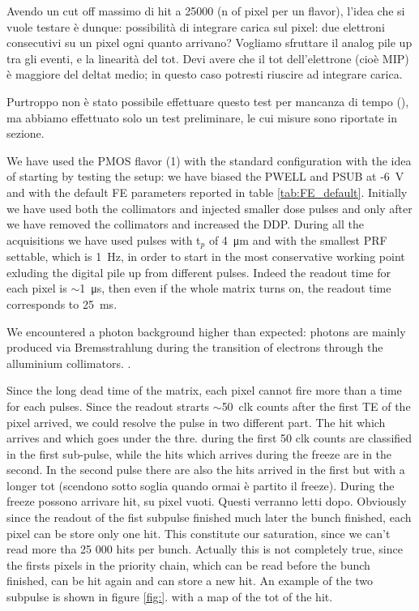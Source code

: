    Avendo un cut off massimo di hit a 25000 (n of pixel per un flavor), l'idea che si vuole testare è dunque: possibilità di integrare carica sul pixel: due elettroni consecutivi su un pixel ogni quanto arrivano?
   Vogliamo sfruttare il analog pile up tra gli eventi, e la linearità del tot. 
   Devi avere che il tot dell'elettrone (cioè MIP) è maggiore del deltat medio; in questo caso potresti riuscire ad integrare carica.

   Purtroppo non è stato possibile effettuare questo test per mancanza di tempo (), ma abbiamo effettuato solo un test preliminare, le cui misure sono riportate in sezione.

   We have used the PMOS flavor (1) with the standard configuration with the idea of starting by testing the setup: we have biased the PWELL and PSUB at -\SI{6}{V} and with the default FE parameters reported in table \ref{tab:FE_default}.
   Initially we have used both the collimators and injected smaller dose pulses and only after we have removed the collimators and increased the DDP. 
   During all the acquisitions we have used pulses with t$_p$ of \SI{4}{\um} and with the smallest PRF settable, which is \SI{1}{Hz}, in order to start in the most conservative working point exluding the digital pile up from different pulses. Indeed the readout time for each pixel is $\sim$\SI{1}{\us}, then even if the whole matrix turns on, the readout time corresponds to \SI{25}{ms}. 

   We encountered a photon background higher than expected: photons are mainly produced via Bremsstrahlung during the transition of electrons through the alluminium collimators.
   .

   Since the long dead time of the matrix, each pixel cannot fire more than a time for each pulses. 
   Since the readout strarts $\sim$\SI{50}{clk} counts after the first TE of the pixel arrived, we could resolve the pulse in two different part. 
   The hit which arrives and which goes under the thre. during the first 50 clk counts are classified in the first sub-pulse, while the hits which arrives during the freeze are in the second. In the second pulse there are also the hits arrived in the first but with a longer tot (scendono sotto soglia quando ormai è partito il freeze). 
   During the freeze possono arrivare hit, su pixel vuoti. Questi verranno letti dopo. 
   Obviously since the readout of the fist subpulse finished much later the bunch finished, each pixel can be store only one hit. 
   This constitute our saturation, since we can't read more tha 25 000 hits per bunch. 
   Actually this is not completely true, since the firsts pixels in the priority chain, which can be read before the bunch finished, can be hit again and can store a new hit. 
   An example of the two subpulse is shown in figure \ref{fig:}. with a map of the tot of the hit. 

